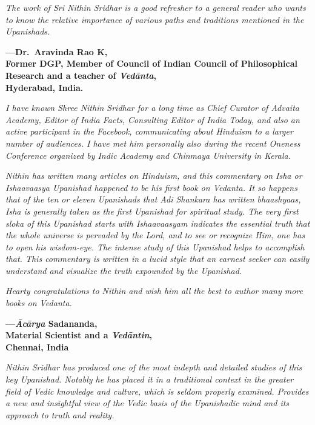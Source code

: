\emph{The work of Sri Nithin Sridhar is a good refresher to a general reader who wants to know the relative importance of various paths and traditions mentioned in the Upanishads.}
\medskip

\begin{flushright}
\textbf{---Dr.\ Aravinda Rao K,}\\
\textbf{Former DGP, Member of Council of Indian Council of Philosophical Research and a teacher of \emph{Vedānta},}\\
\textbf{Hyderabad, India.}
\end{flushright}
\medskip

\emph{I have known Shree Nithin Sridhar for a long time as Chief Curator of Advaita Academy, Editor of India Facts, Consulting Editor of India Today, and also an active participant in the Facebook, communicating about Hinduism to a larger number of audiences. I have met him personally also during the recent Oneness Conference organized by Indic Academy and Chinmaya University in Kerala.}

\emph{Nithin has written many articles on Hinduism, and this commentary on Isha or Ishaavaasya Upanishad happened to be his first book on Vedanta. It so happens that of the ten or eleven Upanishads that Adi Shankara has written bhaashyaas, Isha is generally taken as the first Upanishad for spiritual study. The very first sloka of this Upanishad starts with Ishaavaasyam indicates the essential truth that the whole universe is pervaded by the Lord, and to see or recognize Him, one has to open his wisdom-eye. The intense study of this Upanishad helps to accomplish that. This commentary is written in a lucid style that an earnest seeker can easily understand and visualize the truth expounded by the Upanishad.}

\emph{Hearty congratulations to Nithin and wish him all the best to author many more books on Vedanta.}
\medskip

\begin{flushright}
\textbf{---\emph{Ācārya} Sadananda,}\\
\textbf{Material Scientist and a \emph{Vedāntin},}\\
\textbf{Chennai, India}
\end{flushright}
\medskip

\emph{Nithin Sridhar has produced one of the most indepth and detailed studies of this key Upanishad. Notably he has placed it in a traditional context in the greater field of Vedic knowledge and culture, which is seldom properly examined. Provides a new and insightful view of the Vedic basis of the Upanishadic mind and its approach to truth and reality.}
\medskip

